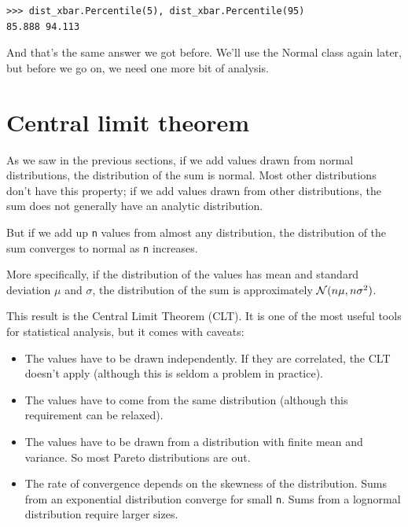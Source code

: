 \documentclass[12pt]{book}
\begin{document}
\begin{verbatim}
>>> dist_xbar.Percentile(5), dist_xbar.Percentile(95)
85.888 94.113
\end{verbatim}

And that's the same answer we got before.  We'll use the Normal
class again later, but before we go on, we need one more bit of
analysis.


\section{Central limit theorem}
\label{CLT}

As we saw in the previous sections, if we add values drawn from normal
distributions, the distribution of the sum is normal.
Most other distributions don't have this property;
if we add values drawn from other distributions, the sum does not
generally have an analytic distribution.
 
 

But if we add up \verb"n" values from
almost any distribution, the distribution of the sum converges to
normal as \verb"n" increases.

More specifically, if the distribution of the values has mean and
standard deviation $\mu$ and $\sigma$, the distribution of the sum is
approximately $\mathcal{N}(n \mu, n \sigma^2)$.

This result is the Central Limit Theorem (CLT).  It is one of the
most useful tools for statistical analysis, but it comes with
caveats:

\begin{itemize}

\item The values have to be drawn independently.  If they are
correlated, the CLT doesn't apply (although this is seldom a problem
in practice).

\item The values have to come from the same distribution (although
  this requirement can be relaxed).

\item The values have to be drawn
  from a distribution with finite mean and variance.  So most Pareto
  distributions are out.

\item The rate of convergence depends
  on the skewness of the distribution.  Sums from an exponential
  distribution converge for small \verb"n".  Sums from a
  lognormal distribution require larger sizes.

\end{itemize}
\end{document}
